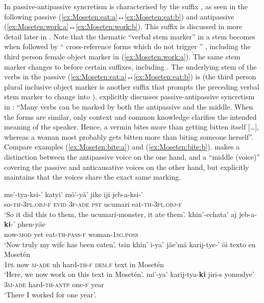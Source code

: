 In  passive-antipassive syncretism is characterised by the suffix , as seen in the following passive  (\ref{ex:Moseten:eat:a}↔\ref{ex:Moseten:eat:b}) and antipassive  (\ref{ex:Moseten:work:a}↔\ref{ex:Moseten:work:b}). This suffix is discussed in more detail later in . Note that the thematic “verbal stem marker”  in a stem becomes  when followed by “ cross-reference forms which do not trigger ” \citep[45]{sakel:2004}, including the third person female object marker  in (\ref{ex:Moseten:work:a}). The same stem marker changes to  before certain suffixes, including  \citep[47, 308]{sakel:2004}. The underlying stem of the verbs in the passive  (\ref{ex:Moseten:eat:a}↔\ref{ex:Moseten:eat:b}) is  (the third person plural inclusive object marker  is another suffix that prompts the preceding verbal stem marker  to change into ). \cite[308]{sakel:2004} explicitly discusses passive-antipassive syncretism in : “Many verbs can be marked by both the antipassive and the middle. When the forms are similar, only context and common knowledge clarifies the intended meaning of the speaker. Hence, a vermin bites more than getting bitten itself […], whereas a woman most probably gets bitten more than biting someone herself”. Compare examples (\ref{ex:Moseten:bite:a}) and (\ref{ex:Moseten:bite:b}). \cite[306ff.]{sakel:2004} makes a distinction between the antipassive voice on the one hand, and a “middle (voice)” covering the passive and anticausative voices on the other hand, but explicitly maintains that the voices share the exact same marking.

\ea {} \citep[231, 306, 311]{sakel:2004}
\ea\label{ex:Moseten:eat:a}
	\gll	me’-tya-ksi-’ katyi’ mö’-yä’ jike iji jeb-a-ksi-’ \\
			so-\textsc{th-3pl.obj-f} \textsc{evid} \textsc{3f-ade} \textsc{pst} ucumari eat-\textsc{th-3pl.obj-f} \\
	\glt	‘So it did this to them, the ucumari-monster, it ate them’.
\ex\label{ex:Moseten:eat:b}
	\gll	khin’-cchata’ aj jeb-a-\textbf{ki}-’ phen-yäe \\
			now-\textsc{mod} yet eat-\textsc{th-pass-f} woman-\textsc{1sg.poss} \\
	\glt	‘Now truly my wife has been eaten’.
\ex\label{ex:Moseten:work:a}
	\gll	tsin khin’ i-ya’ jäe’mä karij-tye-’ öi texto en Mosetén \\
			\textsc{1pl} now \textsc{m-ade} uh hard-\textsc{th-f} \textsc{dem.f} text in Mosetén \\
	\glt	‘Here, we now work on this text in Mosetén’.
\ex\label{ex:Moseten:work:b}
	\gll	mi’-ya’ karij-tya-\textbf{ki} jiri-s yomodye’ \\
			\textsc{3m-ade} hard-\textsc{th-antp} one-\textsc{f} year \\
	\glt	‘There I worked for one year’.
	\z 
\z

